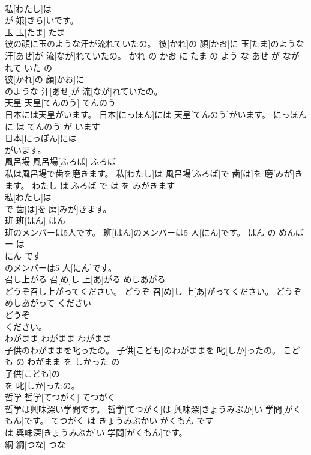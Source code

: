 \documentclass[8pt]{extreport}
\begin{document}
\begin{CJK}{UTF8}{min}
\\	私[わたし]は
\\	が 嫌[きら]いです。			
\\	玉	玉[たま]	たま	
\\	彼の顔に玉のような汗が流れていたの。	彼[かれ]の 顔[かお]に 玉[たま]のような 汗[あせ]が 流[なが]れていたの。	かれ の かお に たま の よう な あせ が ながれて いた の	
\\	彼[かれ]の 顔[かお]に
\\	のような 汗[あせ]が 流[なが]れていたの。			
\\	天皇	天皇[てんのう]	てんのう	
\\	日本には天皇がいます。	日本[にっぽん]には 天皇[てんのう]がいます。	にっぽん に は てんのう が います	
\\	日本[にっぽん]には
\\	がいます。			
\\	風呂場	風呂場[ふろば]	ふろば	
\\	私は風呂場で歯を磨きます。	私[わたし]は 風呂場[ふろば]で 歯[は]を 磨[みが]きます。	わたし は ふろば で は を みがきます	
\\	私[わたし]は
\\	で 歯[は]を 磨[みが]きます。			
\\	班	班[はん]	はん	
\\	班のメンバーは5人です。	班[はん]のメンバーは5 人[にん]です。	はん の めんばー は 
\\	にん です	
\\	のメンバーは5 人[にん]です。			
\\	召し上がる	召[め]し 上[あ]がる	めしあがる	
\\	どうぞ召し上がってください。	どうぞ 召[め]し 上[あ]がってください。	どうぞ めしあがって ください	
\\	どうぞ
\\	ください。			
\\	わがまま	わがまま	わがまま	
\\	子供のわがままを叱ったの。	子供[こども]のわがままを 叱[しか]ったの。	こども の わがまま を しかった の	
\\	子供[こども]の
\\	を 叱[しか]ったの。			
\\	哲学	哲学[てつがく]	てつがく	
\\	哲学は興味深い学問です。	哲学[てつがく]は 興味深[きょうみぶか]い 学問[がくもん]です。	てつがく は きょうみぶかい がくもん です	
\\	は 興味深[きょうみぶか]い 学問[がくもん]です。			
\\	綱	綱[つな]	つな	

\end{CJK}
\end{document}
